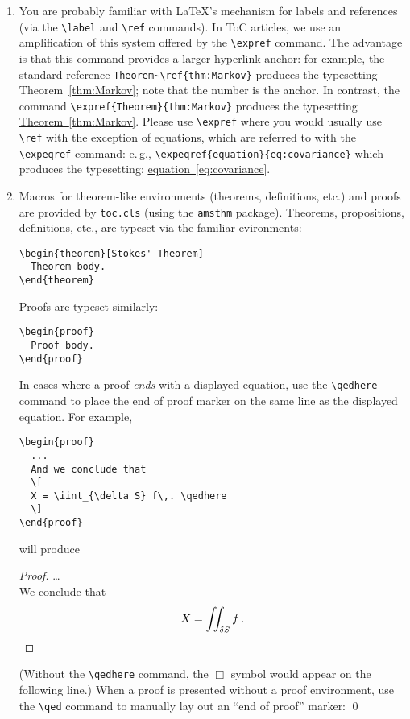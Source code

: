 \documentclass{article}
\newcommand{\eg}{e.\,g.}
\newcommand{\N}{\mathbb{N}}
\newcommand{\Z}{\mathbb{Z}}
\newcommand{\Q}{\mathbb{Q}}
\newcommand{\R}{\mathbb{R}}
\newcommand{\C}{\mathbb{C}}
\newtheorem{theorem}{Theorem}
\theoremstyle{plain}
\newcommand{\expref}[2]{\texorpdfstring{\hyperref[#2]{#1~\ref{#2}}}{#1~\ref{#2}}}
\newcommand{\expeqref}[2]{\texorpdfstring{\hyperref[#2]{#1~\eqref{#2}}}{#1~\eqref{#2}}}
\theoremstyle{definition}
\begin{document}
\begin{enumerate}
  Use \lstinline'\N', \lstinline'\Z', \lstinline'\Q', \lstinline'\R',
  and \lstinline'\C' to produce the symbols for the five common number
  systems; they will be typeset in blackboard-bold as $\N$, $\Z$,
  $\Q$, $\R$, $\C$.  Use the \lstinline'\mathbb' command to create other
  blackboard-bold characters in math mode; for instance
  \lstinline'\mathbb{H}' will produce $\mathbb{H}$, the standard symbol for
  the quaternions.

\item You are probably familiar with \LaTeX's mechanism for labels and
  references (via the \lstinline,\label, and \lstinline,\ref,
  commands). In ToC articles, we use an amplification of this system
  offered by the \lstinline,\expref, command. The advantage is that
  this command provides a larger hyperlink anchor: for example, the
  standard reference \lstinline,Theorem~\ref{thm:Markov}, produces the
  typesetting Theorem~\ref{thm:Markov}; note that the number is the
  anchor. In contrast, the command
  \lstinline,\expref{Theorem}{thm:Markov}, produces the typesetting
  \expref{Theorem}{thm:Markov}. Please use \lstinline,\expref, where
  you would usually use \lstinline,\ref, with the exception of
  equations, which are referred to with the \lstinline`\expeqref`
  command: \eg, \lstinline`\expeqref{equation}{eq:covariance}` which
  produces the typesetting: \expeqref{equation}{eq:covariance}.

\item Macros for theorem-like environments (theorems, definitions,
  etc.) and proofs are provided by \lstinline`toc.cls` (using the
  \lstinline`amsthm` package). Theorems, propositions, definitions, etc.,
  are typeset via the familiar evironments:
\begin{lstlisting}
\begin{theorem}[Stokes' Theorem]
  Theorem body.
\end{theorem}
\end{lstlisting}
Proofs are typeset similarly:
\begin{lstlisting}
\begin{proof}
  Proof body.
\end{proof}
\end{lstlisting}
In cases where a proof \emph{ends} with a displayed equation, use the
\lstinline,\qedhere, command to place the end of proof marker on the same
line as the displayed equation. For example,
\begin{lstlisting}
\begin{proof}
  ...
  And we conclude that
  \[
  X = \iint_{\delta S} f\,. \qedhere
  \]
\end{proof}
\end{lstlisting}
will produce
\begin{proof}
  \dots\\
  We conclude that
  \[
  X = \iint_{\delta S} f\,. \qedhere
  \]
\end{proof}
(Without the \lstinline,\qedhere, command, the $\Box$ symbol would appear on
the following line.) When a proof is presented without a proof
environment, use the \lstinline.\qed. command to manually lay out an ``end
of proof'' marker: \qed



\end{enumerate}
\end{document}
